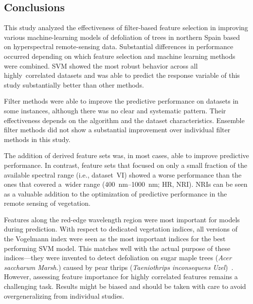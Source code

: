 \documentclass[remotesensing,article,accept,moreauthors,pdftex]{Definitions/mdpi}
\begin{document}
\begin{paracol}{2}
\section{Conclusions}

This study analyzed the effectiveness of filter-based feature selection in improving various machine-learning models of defoliation of trees in northern Spain based on hyperspectral remote-sensing data.
Substantial differences in performance occurred depending on which feature selection and machine learning methods were combined.
SVM showed the most robust behavior across all highly\ correlated datasets and was able to predict the response variable of this study substantially better than other methods.

Filter methods were able to improve the predictive performance on datasets in some instances, although there was no clear and systematic pattern.
Their effectiveness depends on the algorithm and the dataset characteristics.
Ensemble filter methods did not show a substantial improvement over individual filter methods in this study.

The addition of derived feature sets was, in most cases, able to improve predictive performance.
In contrast, feature sets that focused on only a small fraction of the available spectral range (i.e., dataset~VI) showed a worse performance than the ones that covered a\ wider range (400~nm--1000~nm; HR, NRI).
NRIs can be seen as a valuable addition to the optimization of predictive performance in the remote sensing of vegetation.

Features along the red-edge wavelength region were most important for models during prediction.
With respect to dedicated vegetation indices, all versions of the Vogelmann index were seen as the most important indices for the best performing SVM model.
This matches well with the actual purpose of these indices---they were invented to detect defoliation on sugar maple trees (\textit{Acer saccharum Marsh.}) caused by pear thrips (\textit{Taeniothrips inconsequens Uzel})~\cite{vogelmann1993}.
However, assessing feature importance for highly correlated features remains a challenging task.
Results might be biased and should be taken with care to avoid overgeneralizing from individual studies.


\end{paracol}
\end{document}

